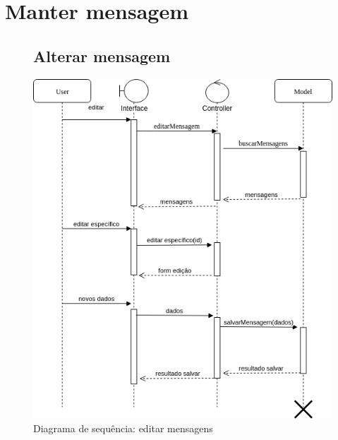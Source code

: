 \documentclass[
	12pt,				%
	openright,			%
	oneside,			%
	a4paper,			%
	english,			%
	french,				%
	spanish,			%
	brazil				%
]{abntex2}
\begin{document}
\section{Manter mensagem}
\begin{figure}[h]	
	\label{figure_diagrama_sequencia_alterar_mensagem}
	\subsection{Alterar mensagem}
	\includegraphics[scale=0.6]{SequenceMensagens/SequenceEditarMensagem.png}
	\caption{Diagrama de sequência: editar mensagens}
	\hfill
\end{figure}
%
\end{document}
